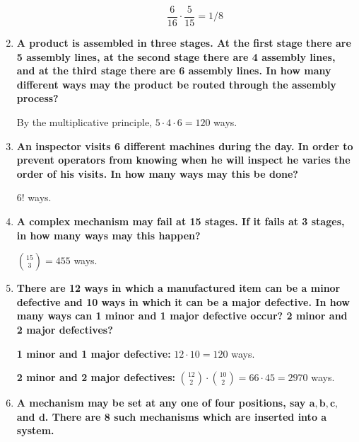 \documentclass[10pt, oneside]{article}   	%
\theoremstyle{definition}
\begin{document}
\begin{enumerate}[label=2.\arabic*]
\begin{enumerate}
  \[ \frac{6}{16} \cdot \frac{5}{15} = \boxed{1/8} \]
	\end{enumerate}
\item \begin{tcolorbox}[
  colback=Cerulean!5!white,
  colframe=Cerulean!75!black]
  \textbf{A product is assembled in three stages. At the first stage there are 5 assembly lines, at the second stage there are 4 assembly lines, and at the third stage there are 6 assembly lines. In how many different ways may the product be routed through the assembly process?}
  \end{tcolorbox}
  
  By the multiplicative principle, $5 \cdot 4 \cdot 6 = \boxed{120}$ ways.
\item \begin{tcolorbox}[
  colback=Cerulean!5!white,
  colframe=Cerulean!75!black]
  \textbf{An inspector visits 6 different machines during the day. In order to prevent operators from knowing when he will inspect he varies the order of his visits. In how many ways may this be done?}
  \end{tcolorbox}
  
  $\boxed{6!}$ ways.
\item \begin{tcolorbox}[
  colback=Cerulean!5!white,
  colframe=Cerulean!75!black]
  \textbf{A complex mechanism may fail at 15 stages. If it fails at 3 stages, in how many ways may this happen?}
  \end{tcolorbox}
  
  $\binom{15}{3} = \boxed{455}$ ways.

\item \begin{tcolorbox}[
  colback=Cerulean!5!white,
  colframe=Cerulean!75!black]
  \textbf{There are 12 ways in which a manufactured item can be a minor defective and 10 ways in which it can be a major defective. In how many ways can 1 minor and 1 major defective occur? 2 minor and 2 major defectives?}
  \end{tcolorbox}
  
  \textbf{1 minor and 1 major defective:} $12 \cdot 10 = \boxed{120}$ ways.
  
  \textbf{2 minor and 2 major defectives:} $\binom{12}{2} \cdot \binom{10}{2} = 66 \cdot 45 = \boxed{2970}$ ways.

\item \begin{tcolorbox}[
  colback=Cerulean!5!white,
  colframe=Cerulean!75!black]
  \textbf{A mechanism may be set at any one of four positions, say $\bm{a,b,c,}$ and $\bm{d}$. There are 8 such mechanisms which are inserted into a system.}
  \end{tcolorbox}
  

\end{enumerate}
\end{document}
